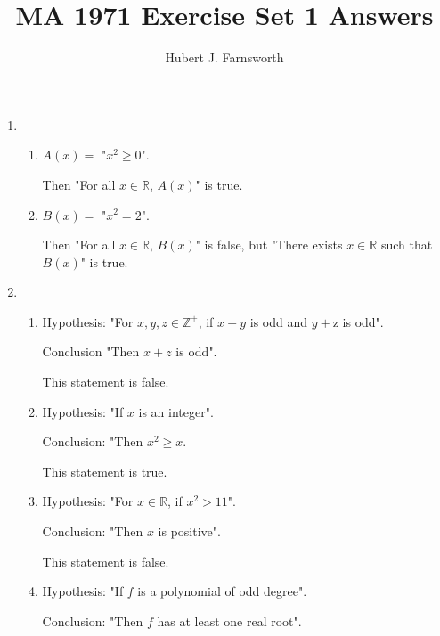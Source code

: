\documentclass[a4paper]{article}
\title{MA 1971 Exercise Set 1 Answers}
\author{Hubert J. Farnsworth}
\begin{document}
\maketitle

\begin{enumerate}

\item
	\begin{enumerate}
		\item
		
		$A(x) = \text{ "} x^2 \geq 0 \text{"}$.
		
		Then "For all $x \in \mathbb{R}$, $A(x)$" is true.
		
		\item
		
		$B(x) = \text{ "} x^2 = 2 \text{"}$.
		
		Then "For all $x \in \mathbb{R}$, $B(x)$" is false, but 		"There exists $x \in \mathbb{R}$ such that $B(x)$" is true. 
		
	\end{enumerate}
	
\item
	\begin{enumerate}
	\item
	
	Hypothesis: "For $x,y,z \in \mathbb{Z}^+$, if $x + y$ is 		odd and $y + $z is odd".
	
	Conclusion "Then $x + z$ is odd".
	
	This statement is false.
	
	\item 
	
	Hypothesis: "If $x$ is an integer".
	
	Conclusion: "Then $x^2 \geq x$.
	
	This statement is true.
	
	\item
	
	Hypothesis: "For $x \in \mathbb{R}$, if $x^2 > 11$".
	
	Conclusion: "Then $x$ is positive".
	
	This statement is false.
	
	\item
	
	Hypothesis: "If $f$ is a polynomial of odd degree".
	
	Conclusion: "Then $f$ has at least one real root".
	

\end{enumerate}
\end{enumerate}
\end{document}
